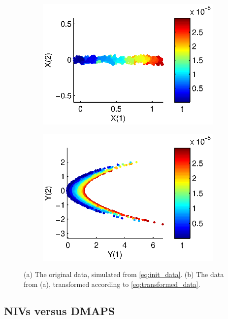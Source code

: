 \documentclass[1p]{elsarticle}
\begin{document}
\begin{figure}[h]
\begin{subfigure}{0.5\textwidth}
\includegraphics[width=\textwidth]{data_init}
\caption{}
\end{subfigure}
\begin{subfigure}{0.5\textwidth}
\includegraphics[width=\textwidth]{data_transformed}
\caption{}
\end{subfigure}
\caption{(a) The original data, simulated from \eqref{eq:init_data}. (b) The data from (a), transformed according to \eqref{eq:transformed_data}. }
\label{fig:initial_data}
\end{figure}



\subsection{NIVs versus DMAPS}
\end{document}
